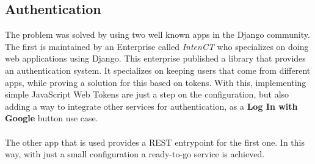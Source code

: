 \documentclass[./main.tex]{subfiles}
\begin{document}
\subsection{Authentication}

The problem was solved by using two well known apps in the Django
community. The first is maintained by an Enterprise called \emph{IntenCT}
who specializes on doing web applications using Django. This enterprise
published a library that provides an authentication system. It
specializes on keeping users that come from different apps, while
proving a solution for this based on tokens. With this, implementing
simple JavaScript Web Tokens are just a step on the configuration, but
also adding a way to integrate other services for authentication, as a
\textbf{Log In with Google} button use case.\\
\\
The other app that is used provides a REST entrypoint for the first one.
In this way, with just a small configuration a ready-to-go service is
achieved.
\end{document}
